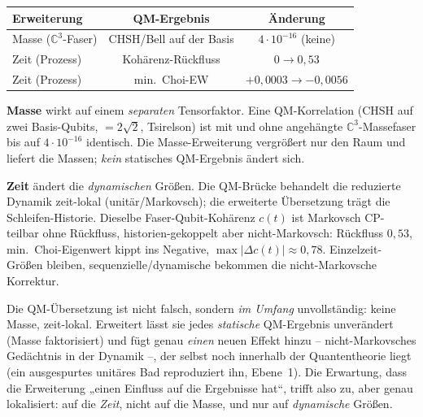 \begin{center}
\begin{tabular}{lcc}
\toprule
Erweiterung & QM-Ergebnis & Änderung \\
\midrule
Masse ($\mathbb{C}^3$-Faser) & CHSH/Bell auf der Basis & $4\cdot10^{-16}$ (keine) \\
Zeit (Prozess) & Kohärenz-Rückfluss & $0 \to 0{,}53$ \\
Zeit (Prozess) & min.\ Choi-EW & $+0{,}0003 \to -0{,}0056$ \\
\bottomrule
\end{tabular}
\end{center}

\textbf{Masse} wirkt auf einem \emph{separaten} Tensorfaktor. Eine QM-Korrelation
(CHSH auf zwei Basis-Qubits, $=2\sqrt2$, Tsirelson) ist mit und ohne angehängte
$\mathbb{C}^3$-Massefaser bis auf $4\cdot10^{-16}$ identisch. Die
Masse-Erweiterung vergrößert nur den Raum und liefert die Massen; \emph{kein}
statisches QM-Ergebnis ändert sich.

\textbf{Zeit} ändert die \emph{dynamischen} Größen. Die QM-Brücke behandelt die
reduzierte Dynamik zeit-lokal (unitär/Markovsch); die erweiterte Übersetzung
trägt die Schleifen-Historie. Dieselbe Faser-Qubit-Kohärenz $c(t)$ ist Markovsch
CP-teilbar ohne Rückfluss, historien-gekoppelt aber nicht-Markovsch: Rückfluss
$0{,}53$, min.\ Choi-Eigenwert kippt ins Negative,
$\max|\Delta c(t)|\approx0{,}78$. Einzelzeit-Größen bleiben,
sequenzielle/dynamische bekommen die nicht-Markovsche Korrektur.

\begin{keyresult}
Die QM-Übersetzung ist nicht falsch, sondern \emph{im Umfang} unvollständig:
keine Masse, zeit-lokal. Erweitert lässt sie jedes \emph{statische} QM-Ergebnis
unverändert (Masse faktorisiert) und fügt genau \emph{einen} neuen Effekt hinzu
-- nicht-Markovsches Gedächtnis in der Dynamik --, der selbst noch innerhalb der
Quantentheorie liegt (ein ausgespurtes unitäres Bad reproduziert ihn, Ebene~1).
Die Erwartung, dass die Erweiterung „einen Einfluss auf die Ergebnisse hat``,
trifft also zu, aber genau lokalisiert: auf die \emph{Zeit}, nicht auf die Masse,
und nur auf \emph{dynamische} Größen.
\end{keyresult}

